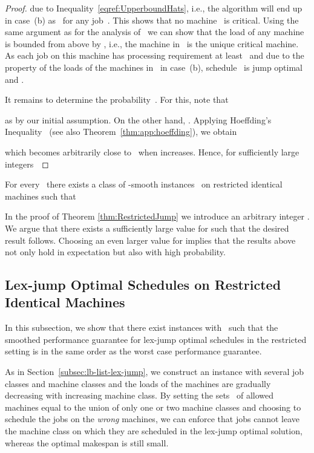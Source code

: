 \documentclass[a4paper,11pt,fleqn]{article}
\begin{document}
\begin{proof}
due to Inequality~\eqref{eqref:UpperboundHats}, i.e., the
algorithm will end up in case~(b) as~ for any job~. This shows that no machine~ is critical. Using the
same argument as for the analysis of~ we can show that the load of any
machine~ is bounded from above by , i.e., the machine in~ is the
unique critical machine. As each job on this machine has processing requirement
at least~ and due to the property of the loads of the machines in~ in
case~(b), schedule~ is jump optimal and .

It remains to determine the probability~. For this, note that

as  by our initial assumption. On the other hand, .
Applying Hoeffding's Inequality~\cite{Hoeffding:1963} (see also Theorem~\ref{thm:app:hoeffding}), we obtain

which becomes arbitrarily close to~ when  increases. Hence, for sufficiently large integers~

\end{proof}


\begin{cor}
For every~ there exists a class of -smooth instances~ on
restricted identical machines such that

\end{cor}

\begin{remark}
In the proof of Theorem \ref{thm:RestrictedJump} we introduce an arbitrary integer . We argue that there exists a sufficiently large value for  such that the desired result follows. Choosing an even larger value for  implies that the results above not only hold in expectation but also with high probability.
\end{remark}












\subsection{Lex-jump Optimal Schedules on Restricted Identical Machines}
\label{subsec:lb-lex-jump-restricted}
In this subsection, we show that there exist instances with~ such that the smoothed performance guarantee for lex-jump optimal schedules in the restricted setting is in the same order as the worst case performance guarantee.

As in Section~\ref{subsec:lb-list-lex-jump}, we construct an instance with
several job classes and machine classes and the loads of the machines
are gradually decreasing with increasing machine class.
By setting the sets~ of allowed machines equal to the union of
only one or two machine classes and choosing to schedule the jobs on the
\emph{wrong} machines, we can enforce that jobs cannot leave the machine class
on which they are scheduled in the lex-jump
optimal solution, whereas the optimal makespan is still small.
\end{document}

